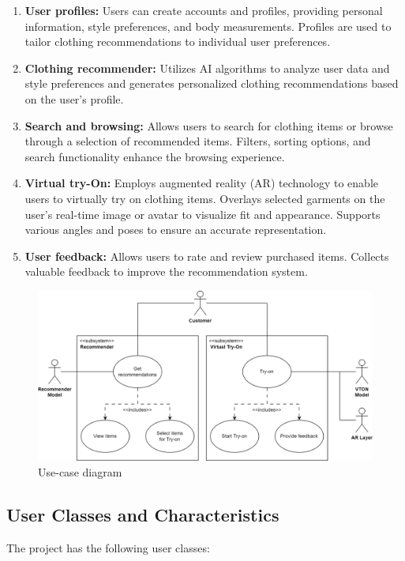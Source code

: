 		\begin{enumerate}
			\item \textbf{User profiles:} Users can create accounts and profiles, providing personal information, style preferences, and body measurements. Profiles are used to tailor clothing recommendations to individual user preferences.
			\item \textbf{Clothing recommender:} Utilizes AI algorithms to analyze user data and style preferences and generates personalized clothing recommendations based on the user's profile.
			\item \textbf{Search and browsing:} Allows users to search for clothing items or browse through a selection of recommended items. Filters, sorting options, and search functionality enhance the browsing experience.
			\item \textbf{Virtual try-On:} Employs augmented reality (AR) technology to enable users to virtually try on clothing items. Overlays selected garments on the user's real-time image or avatar to visualize fit and appearance. Supports various angles and poses to ensure an accurate representation.
			\item \textbf{User feedback:} Allows users to rate and review purchased items. Collects valuable feedback to improve the recommendation system.
		\end{enumerate}

		\begin{figure}
			\includegraphics[width=\textwidth]{components/images/use-case.png}
			\caption{Use-case diagram}
			\label{fig:use-case}
		\end{figure}

	\subsection{User Classes and Characteristics}
		The project has the following user classes: 


